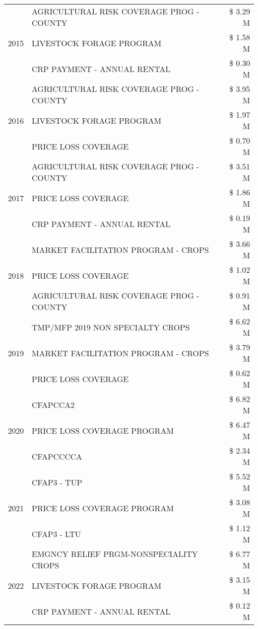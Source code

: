 \begin{tabular}{llr}
\multirow[t]{3}{*}{2015} & AGRICULTURAL RISK COVERAGE PROG - COUNTY & \$ 3.29 M \\
 & LIVESTOCK FORAGE PROGRAM & \$ 1.58 M \\
 & CRP PAYMENT - ANNUAL RENTAL & \$ 0.30 M \\
\cline{1-3}
\multirow[t]{3}{*}{2016} & AGRICULTURAL RISK COVERAGE PROG - COUNTY & \$ 3.95 M \\
 & LIVESTOCK FORAGE PROGRAM & \$ 1.97 M \\
 & PRICE LOSS COVERAGE & \$ 0.70 M \\
\cline{1-3}
\multirow[t]{3}{*}{2017} & AGRICULTURAL RISK COVERAGE PROG - COUNTY & \$ 3.51 M \\
 & PRICE LOSS COVERAGE & \$ 1.86 M \\
 & CRP PAYMENT - ANNUAL RENTAL & \$ 0.19 M \\
\cline{1-3}
\multirow[t]{3}{*}{2018} & MARKET FACILITATION PROGRAM - CROPS & \$ 3.66 M \\
 & PRICE LOSS COVERAGE & \$ 1.02 M \\
 & AGRICULTURAL RISK COVERAGE PROG - COUNTY & \$ 0.91 M \\
\cline{1-3}
\multirow[t]{3}{*}{2019} & TMP/MFP 2019 NON SPECIALTY CROPS & \$ 6.62 M \\
 & MARKET FACILITATION PROGRAM - CROPS & \$ 3.79 M \\
 & PRICE LOSS COVERAGE & \$ 0.62 M \\
\cline{1-3}
\multirow[t]{3}{*}{2020} & CFAPCCA2 & \$ 6.82 M \\
 & PRICE LOSS COVERAGE PROGRAM & \$ 6.47 M \\
 & CFAPCCCCA & \$ 2.34 M \\
\cline{1-3}
\multirow[t]{3}{*}{2021} & CFAP3 - TUP & \$ 5.52 M \\
 & PRICE LOSS COVERAGE PROGRAM & \$ 3.08 M \\
 & CFAP3 - LTU & \$ 1.12 M \\
\cline{1-3}
\multirow[t]{3}{*}{2022} & EMGNCY RELIEF PRGM-NONSPECIALITY CROPS & \$ 6.77 M \\
 & LIVESTOCK FORAGE PROGRAM & \$ 3.15 M \\
 & CRP PAYMENT - ANNUAL RENTAL & \$ 0.12 M \\
\cline{1-3}
\bottomrule
\end{tabular}
